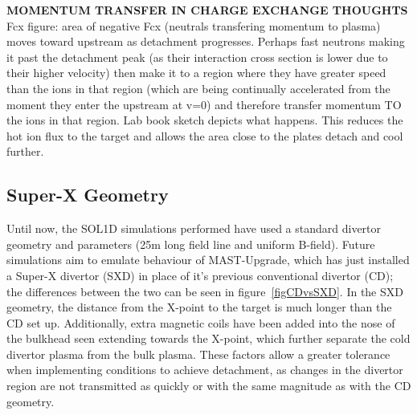 \documentclass[12pt]{article}  %
\begin{document}
\textbf{MOMENTUM TRANSFER IN CHARGE EXCHANGE THOUGHTS}
Fcx figure: area of negative Fcx (neutrals transfering momentum to plasma) moves toward upstream as detachment progresses. Perhaps fast neutrons making it past the detachment peak (as their interaction cross section is lower due to their higher velocity) then make it to a region where they have greater speed than the ions in that region (which are being continually accelerated from the moment they enter the upstream at v=0) and therefore transfer momentum TO the ions in that region. Lab book sketch depicts what happens. This reduces the hot ion flux to the target and allows the area close to the plates detach and cool further.



\subsection{Super-X Geometry}\label{ssecSXG}
Until now, the SOL1D simulations performed have used a standard divertor geometry and parameters (25m long field line and uniform B-field). Future simulations aim to emulate behaviour of MAST-Upgrade, which has just installed a Super-X divertor (SXD) in place of it's previous conventional divertor (CD); the differences between the two can be seen in figure~\ref{figCDvsSXD}. In the SXD geometry, the distance from the X-point to the target is much longer than the CD set up. Additionally, extra magnetic coils have been added into the nose of the bulkhead seen extending towards the X-point, which further separate the cold divertor plasma from the bulk plasma. These factors allow a greater tolerance when implementing conditions to achieve detachment, as changes in the divertor region are not transmitted as quickly or with the same magnitude as with the CD geometry.
\end{document}
